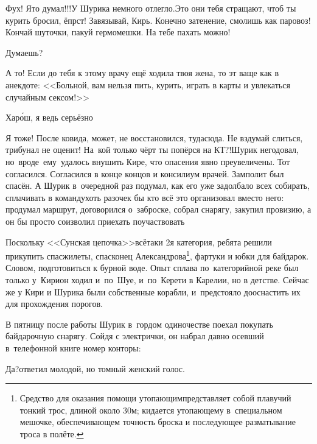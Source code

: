 \diagdash Фух! Я\sdash то думал!!!\mdash У Шурика немного отлегло.\mdash Это они тебя стращают, чтоб ты курить бросил, ёпрст! Завязывай, Кирь. Конечно затенение, смолишь как паровоз! Кончай шуточки, пакуй гермомешки. На тебе пахать можно!


\diagdash Думаешь?

\diagdash А то! Если до тебя к этому врачу ещё ходила твоя жена, то эт ваще как в анекдоте: <<Больной, вам нельзя пить, курить, играть в карты и увлекаться случайным сексом!>>

\diagdash Хар\'{о}ш, я ведь серьёзно\myldots{}

\diagdash Я тоже! После ковида, может, не восстановился, туда\sdash сюда. Не вздумай слиться, трибунал не оценит! На~кой только чёрт ты попёрся на КТ?!\mdash Шурик негодовал, но~вроде~ему~удалось внушить Кире, что опасения явно преувеличены. Тот согласился. Согласился в конце концов и консилиум врачей. Замполит был спасён. А Шурик в~очередной раз подумал, как его уже задолбало всех собирать, сплачивать в команду\mdash хоть разочек бы кто всё это организовал вместо него: продумал маршрут, договорился о~заброске, собрал снарягу, закупил провизию, а он бы просто соизволил приехать поучаствовать\myldots{}

\renewcommand*{\thefootnote}{\fnsymbol{footnote}}
\myldots{}Поскольку <<Сунская цепочка>>\mdash всё\sdash таки 2\sdash я категория, ребята решили прикупить спасжилеты, спасконец Александрова\footnote[1]{Средство для оказания помощи утопающим\mdash представляет собой плавучий тонкий трос, длиной около 30\thinspace м; кидается утопающему в~специальном мешочке, обеспечивающем точность броска и последующее разматывание троса в полёте.}, фартуки и юбки для байдарок. Словом, подготовиться к бурной воде. Опыт сплава по~категорийной реке был только у~Кири\mdash он ходил и~по~Шуе, и~по~Керети в Карелии, но в детстве. Сейчас же у Кири и Шурика были собственные корабли, и~предстояло дооснастить их для прохождения порогов. 

В пятницу после работы Шурик в~гордом одиночестве поехал покупать байдарочную снарягу. Сойдя с электрички, он набрал давно осевший в~телефонной книге номер конторы:

\diagdash Да?\mdash ответил молодой, но томный женский голос.%

